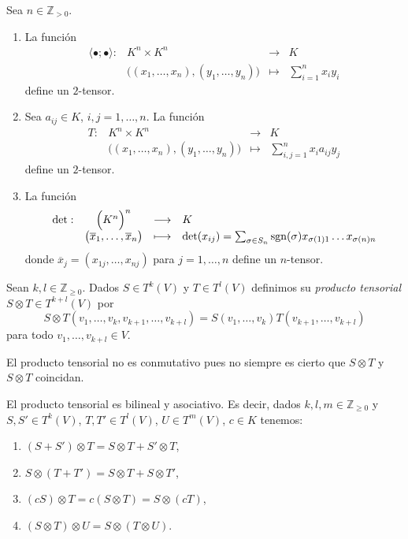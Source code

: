 \begin{ejem} Sea $n\in\mathbb{Z}_{>0}$.
\begin{enumerate}
\item La funci\'on
$$\begin{array}{rccl}
\langle\bullet;\bullet\rangle: & K^n\times K^n &\longrightarrow & K\\
&\Big((x_1,\ldots,x_n),(y_1,\ldots,y_n)\Big) & \longmapsto & \sum_{i=1}^nx_iy_i
\end{array}
$$
define un $2$-tensor.
\item Sea $a_{ij}\in K$, $i,j=1,\ldots,n$. La funci\'on
$$\begin{array}{rccl}
T: & K^n\times K^n&\longrightarrow & K\\
&\Big((x_1,\ldots,x_n),(y_1,\ldots,y_n)\Big) & \longmapsto & \sum_{i,j=1}^nx_ia_{ij}y_j
\end{array}
$$
define un $2$-tensor.
\item La funci\'on
$$\begin{array}{rccl}
\det: & \Big(K^n\Big)^n &\longrightarrow & K\\
&\big(\overline{x}_1,\ldots,\overline{x}_n\big) & \longmapsto & \det(x_{ij})=\sum_{\sigma\in S_n}\operatorname{sgn}(\sigma)x_{\sigma(1)1}\ldots x_{\sigma(n)n}
\end{array}
$$
donde $\overline{x}_j=(x_{1j},\ldots,x_{nj})$ para $j=1,\ldots,n$ define un $n$-tensor.
\end{enumerate}
\end{ejem}

\begin{defn}
Sean $k,l\in\mathbb{Z}_{\ge 0}$. Dados $S\in T^k(V)$ y $T\in T^l(V)$ definimos su \emph{producto tensorial} $S\otimes T\in T^{k+l}(V)$ por
$$ S\otimes T(v_1,\ldots,v_k,v_{k+1},\ldots,v_{k+l})= S(v_1,\ldots,v_k)T(v_{k+1},\ldots,v_{k+l}) $$
para todo $v_1,\ldots,v_{k+l}\in V$.
\end{defn}

\begin{obs}
El producto tensorial no es conmutativo pues no siempre es cierto que $S\otimes T$ y $S\otimes T$ coincidan.
\end{obs}

\begin{pro}\label{ptbya}
El producto tensorial es bilineal y asociativo. Es decir, dados $k,l,m\in\mathbb{Z}_{\ge 0}$ y $S,S'\in T^k(V)$, $T,T'\in T^l(V)$, $U\in T^m(V)$, $c\in K$ tenemos:
\begin{enumerate}
\item $(S+S')\otimes T=S\otimes T + S'\otimes T$,
\item $S\otimes (T+T')=S\otimes T + S\otimes T'$,
\item $(cS)\otimes T=c(S\otimes T)=S\otimes(cT)$,
\item $(S\otimes T)\otimes U=S\otimes (T\otimes U)$.
\end{enumerate} 
\end{pro}


